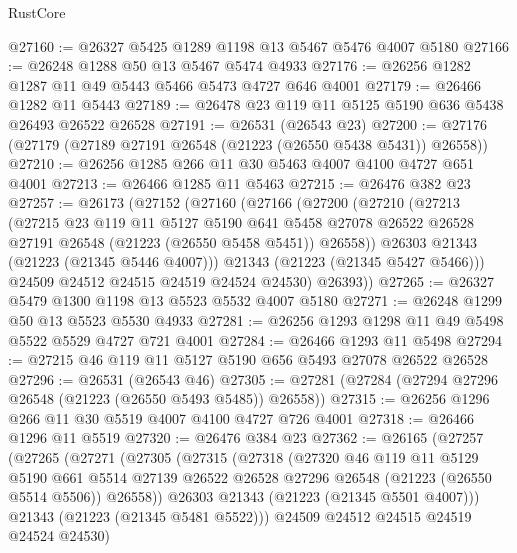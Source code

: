 \begin{lexlean}{RustCore}
\begin{coremodule}
@27160 := @26327 @5425 @1289 @1198 @13 @5467 @5476 @4007 @5180
@27166 := @26248 @1288 @50 @13 @5467 @5474 @4933
@27176 := @26256 @1282 @1287 @11 @49 @5443 @5466 @5473 @4727 @646 @4001
@27179 := @26466 @1282 @11 @5443
@27189 := @26478 @23 @119 @11 @5125 @5190 @636 @5438 @26493 @26522 @26528
@27191 := @26531 (@26543 @23)
@27200 := @27176 (@27179 (@27189 @27191 @26548 (@21223 (@26550 @5438 @5431)) @26558))
@27210 := @26256 @1285 @266 @11 @30 @5463 @4007 @4100 @4727 @651 @4001
@27213 := @26466 @1285 @11 @5463
@27215 := @26476 @382 @23
@27257 := @26173
    (@27152
      (@27160
        (@27166
          (@27200
            (@27210
              (@27213
                (@27215
                  @23
                  @119
                  @11
                  @5127
                  @5190
                  @641
                  @5458
                  @27078
                  @26522
                  @26528
                  @27191
                  @26548
                  (@21223 (@26550 @5458 @5451))
                  @26558))
              @26303
              @21343
              (@21223 (@21345 @5446 @4007)))
            @21343
            (@21223 (@21345 @5427 @5466)))
          @24509
          @24512
          @24515
          @24519
          @24524
          @24530)
        @26393))
@27265 := @26327 @5479 @1300 @1198 @13 @5523 @5532 @4007 @5180
@27271 := @26248 @1299 @50 @13 @5523 @5530 @4933
@27281 := @26256 @1293 @1298 @11 @49 @5498 @5522 @5529 @4727 @721 @4001
@27284 := @26466 @1293 @11 @5498
@27294 := @27215 @46 @119 @11 @5127 @5190 @656 @5493 @27078 @26522 @26528
@27296 := @26531 (@26543 @46)
@27305 := @27281 (@27284 (@27294 @27296 @26548 (@21223 (@26550 @5493 @5485)) @26558))
@27315 := @26256 @1296 @266 @11 @30 @5519 @4007 @4100 @4727 @726 @4001
@27318 := @26466 @1296 @11 @5519
@27320 := @26476 @384 @23
@27362 := @26165
    (@27257
      (@27265
        (@27271
          (@27305
            (@27315
              (@27318
                (@27320
                  @46
                  @119
                  @11
                  @5129
                  @5190
                  @661
                  @5514
                  @27139
                  @26522
                  @26528
                  @27296
                  @26548
                  (@21223 (@26550 @5514 @5506))
                  @26558))
              @26303
              @21343
              (@21223 (@21345 @5501 @4007)))
            @21343
            (@21223 (@21345 @5481 @5522)))
          @24509
          @24512
          @24515
          @24519
          @24524
          @24530)

\end{coremodule}
\end{lexlean}
